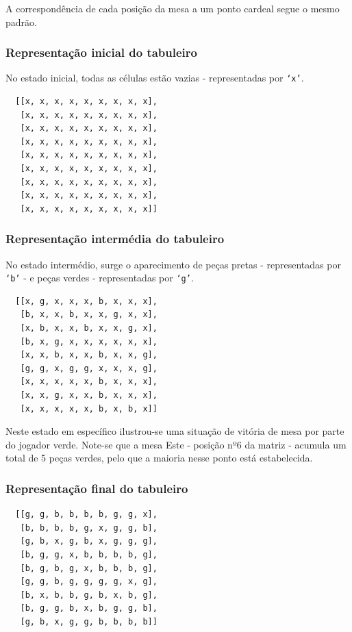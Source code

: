 \documentclass[a4paper]{article}
\begin{document}
A correspondência de cada posição da mesa a um ponto cardeal segue o mesmo padrão.

\subsubsection{Representação inicial do tabuleiro}
No estado inicial, todas as células estão vazias - representadas por \texttt{`x'}.
\begin{lstlisting}
  [[x, x, x, x, x, x, x, x, x],
   [x, x, x, x, x, x, x, x, x],
   [x, x, x, x, x, x, x, x, x],
   [x, x, x, x, x, x, x, x, x],
   [x, x, x, x, x, x, x, x, x],
   [x, x, x, x, x, x, x, x, x],
   [x, x, x, x, x, x, x, x, x],
   [x, x, x, x, x, x, x, x, x],
   [x, x, x, x, x, x, x, x, x]]
\end{lstlisting}

\subsubsection{Representação intermédia do tabuleiro}
No estado intermédio, surge o aparecimento de peças pretas - representadas por \texttt{`b'} - e peças verdes - representadas por \texttt{`g'}.
\begin{lstlisting}
  [[x, g, x, x, x, b, x, x, x],
   [b, x, x, b, x, x, g, x, x],
   [x, b, x, x, b, x, x, g, x],
   [b, x, g, x, x, x, x, x, x],
   [x, x, b, x, x, b, x, x, g],
   [g, g, x, g, g, x, x, x, g],
   [x, x, x, x, x, b, x, x, x],
   [x, x, g, x, x, b, x, x, x],
   [x, x, x, x, x, b, x, b, x]]
\end{lstlisting}

Neste estado em específico ilustrou-se uma situação de vitória de mesa por parte do jogador verde. Note-se que a mesa Este - posição nº6 da matriz - acumula um total de 5 peças verdes, pelo que a maioria nesse ponto está estabelecida.

\subsubsection{Representação final do tabuleiro}

\begin{lstlisting}
  [[g, g, b, b, b, b, g, g, x],
   [b, b, b, b, g, x, g, g, b],
   [g, b, x, g, b, x, g, g, g],
   [b, g, g, x, b, b, b, b, g],
   [b, g, b, g, x, b, b, b, g],
   [g, g, b, g, g, g, g, x, g],
   [b, x, b, b, g, b, x, b, g],
   [b, g, g, b, x, b, g, g, b],
   [g, b, x, g, g, b, b, b, b]]
\end{lstlisting}
\end{document}
